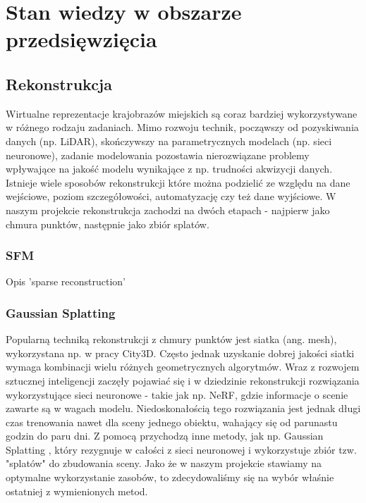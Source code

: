 \section{Stan wiedzy w obszarze przedsięwzięcia}



\subsection{Rekonstrukcja}

Wirtualne reprezentacje krajobrazów miejskich są coraz bardziej wykorzystywane w różnego rodzaju zadaniach. Mimo rozwoju technik, począwszy od pozyskiwania danych (np. LiDAR), skończywszy na parametrycznych modelach (np. sieci neuronowe), zadanie modelowania pozostawia nierozwiązane problemy wpływające na jakość modelu wynikające z np. trudności akwizycji danych. 
Istnieje wiele sposobów rekonstrukcji które można podzielić ze względu na dane wejściowe, poziom szczegółowości, automatyzację czy też dane wyjściowe. W naszym projekcie rekonstrukcja zachodzi na dwóch etapach - najpierw jako chmura punktów, następnie jako zbiór splatów. 

\subsubsection{SFM}
Opis 'sparse reconstruction'

\subsubsection{Gaussian Splatting}

Popularną techniką rekonstrukcji z chmury punktów jest siatka (ang. mesh), wykorzystana np. w pracy City3D\cite{city3D}. Często jednak uzyskanie dobrej jakości siatki wymaga kombinacji wielu różnych geometrycznych algorytmów. Wraz z rozwojem sztucznej inteligencji zaczęły pojawiać się i w dziedzinie rekonstrukcji rozwiązania wykorzystujące sieci neuronowe - takie jak np. NeRF\cite{nerf}, gdzie informacje o scenie zawarte są w wagach modelu. Niedoskonałością tego rozwiązania jest jednak długi czas trenowania nawet dla sceny jednego obiektu, wahający się od parunastu godzin do paru dni. Z pomocą przychodzą inne metody, jak np. Gaussian Splatting \cite{gaussiansplatting}, który rezygnuje w całości z sieci neuronowej i wykorzystuje zbiór tzw. "splatów" do zbudowania sceny. Jako że w naszym projekcie stawiamy na optymalne wykorzystanie zasobów, to zdecydowaliśmy się na wybór właśnie ostatniej z wymienionych metod. 

